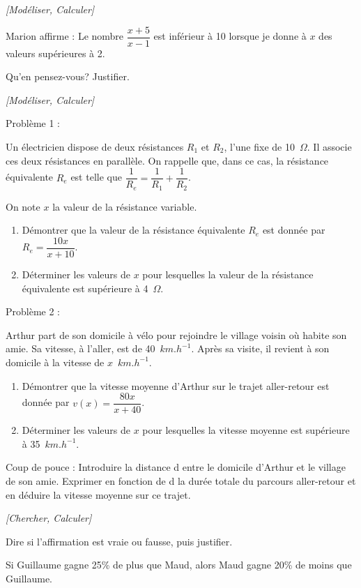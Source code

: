 \exo \textit{[Modéliser, Calculer]}

Marion affirme : \og Le nombre $\dfrac{x+5}{x-1}$  est inférieur à 10 lorsque je donne à $x$ des valeurs supérieures à 2. \fg{} 

Qu'en pensez-vous? Justifier.

\medskip

\exo \textit{[Modéliser, Calculer]}

Problème  1 :

Un électricien dispose de deux résistances $R_1$ et $R_2$, l'une fixe de 10~$\Omega$. Il associe ces deux résistances en parallèle. On rappelle que, dans ce cas, la résistance équivalente $R_e$ est telle que $\dfrac{1}{R_e}=\dfrac{1}{R_1}+\dfrac{1}{R_2}$.

On note $x$ la valeur de la résistance variable.

\begin{enumerate}
\item Démontrer que la valeur de la résistance équivalente $R_e$ est donnée par $R_e=\dfrac{10x}{x+10}$.
\item Déterminer les valeurs de $x$ pour lesquelles la valeur de la résistance équivalente est supérieure à 4~$\Omega$.
\end{enumerate}

Problème  2 :

Arthur part de son domicile à vélo pour rejoindre le village voisin où habite son amie. Sa vitesse, à l'aller, est de 40~$km.h^{-1}$. Après sa visite, il revient à son domicile à la vitesse de $x$~$km.h^{-1}$.


\begin{enumerate}
\item Démontrer que la vitesse moyenne d'Arthur sur le trajet aller-retour est donnée par $v(x)=\dfrac{80x}{x+40}$.
\item Déterminer les valeurs de $x$ pour lesquelles la vitesse moyenne est supérieure à 35~$km.h^{-1}$.
\end{enumerate}

Coup de pouce : Introduire la distance d entre le domicile d'Arthur et le village de son amie. Exprimer en fonction de d la durée totale du parcours aller-retour et en déduire la vitesse moyenne sur ce trajet.


\exo \textit{[Chercher, Calculer]}

Dire si l'affirmation est vraie ou fausse, puis justifier.

\og Si Guillaume gagne 25\% de plus que Maud, alors Maud gagne 20\% de moins que Guillaume. \fg{} 




